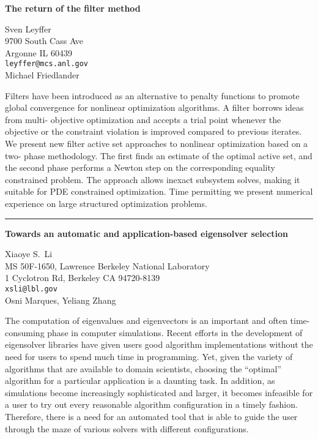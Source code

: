 \documentclass[twosided]{report}
\begin{document}
\begin{center}
{\large			%
{\bf The return of the filter method}}

	Sven Leyffer \\
	9700 South Cass Ave \\
	Argonne IL 60439 \\
	{\tt leyffer@mcs.anl.gov} \\
	Michael Friedlander
\end{center}
Filters have been introduced as an alternative to penalty
functions to promote global convergence for nonlinear
optimization algorithms. A filter borrows ideas from multi-
objective optimization and accepts a trial point whenever
the objective or the constraint violation is improved
compared to previous iterates. We present new filter active
set approaches to nonlinear optimization based on a two-
phase methodology. The first finds an estimate of the
optimal active set, and the second phase performs a Newton
step on the corresponding equality constrained problem. The
approach allows inexact subsystem solves, making it suitable
for PDE constrained optimization. Time permitting we present
numerical experience on large structured optimization
problems.



	\begin{center} \rule{6in}{1pt} \end{center}

\begin{center}
{\large			%
{\bf Towards an automatic and application-based eigensolver selection}}

	Xiaoye S.~Li \\
	MS 50F-1650, Lawrence Berkeley National Laboratory \\
	1 Cyclotron Rd, Berkeley CA 94720-8139 \\
	{\tt xsli@lbl.gov} \\
	Osni Marques, Yeliang Zhang
\end{center}
The computation of eigenvalues and eigenvectors is an
important and often time-consuming phase in computer
simulations. Recent efforts in the development of
eigensolver libraries have given users good algorithm
implementations without the need for users to spend much
time in programming. Yet, given the variety of algorithms
that are available to domain scientists, choosing the
``optimal'' algorithm for a particular application is a
daunting task. In addition, as simulations become
increasingly sophisticated and larger, it becomes infeasible
for a user to try out every reasonable algorithm
configuration in a timely fashion. Therefore, there is a
need for an automated tool that is able to guide the user
through the maze of various solvers with different
configurations.
\end{document}
